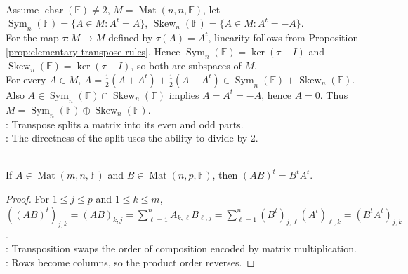 \begin{example} \label{ex:matrix-space-symmetric-skew-direct-sum} \\
Assume $\operatorname{char}(\mathbb{F})\neq2$, $M=\operatorname{Mat}(n,n,\mathbb{F})$, let $\operatorname{Sym}_n(\mathbb{F})=\{A\in M:A^t=A\}$, $\operatorname{Skew}_n(\mathbb{F})=\{A\in M:A^t=-A\}$.\\
For the map $\tau:M\to M$ defined by $\tau(A)=A^t$, linearity follows from Proposition \ref{prop:elementary-transpose-rules}. Hence $\operatorname{Sym}_n(\mathbb{F})=\ker(\tau-I)$ and $\operatorname{Skew}_n(\mathbb{F})=\ker(\tau+I)$, so both are subspaces of $M$.\\
For every $A\in M$, $A=\frac12(A+A^t)+\frac12(A-A^t) \in\operatorname{Sym}_n(\mathbb{F})+\operatorname{Skew}_n(\mathbb{F})$.\\
Also $A\in\operatorname{Sym}_n(\mathbb{F})\cap\operatorname{Skew}_n(\mathbb{F})$ implies $A=A^t=-A$, hence $A=0$. Thus $M=\operatorname{Sym}_n(\mathbb{F})\oplus\operatorname{Skew}_n(\mathbb{F})$.\\
: Transpose splits a matrix into its even and odd parts.\\
: The directness of the split uses the ability to divide by $2$.
\end{example}

\begin{proposition} \label{prop:transpose-reverses-products} \\
If $A\in\operatorname{Mat}(m,n,\mathbb{F})$ and $B\in\operatorname{Mat}(n,p,\mathbb{F})$, then $(AB)^t=B^tA^t$.
\begin{proof}
For $1\leq j\leq p$ and $1\leq k\leq m$, $((AB)^t)_{j,k}=(AB)_{k,j}=\sum\limits_{\ell=1}^n A_{k,\ell}B_{\ell,j}=\sum\limits_{\ell=1}^n (B^t)_{j,\ell}(A^t)_{\ell,k}=(B^tA^t)_{j,k}$.\\
: Transposition swaps the order of composition encoded by matrix multiplication.\\
: Rows become columns, so the product order reverses.
\end{proof}
\end{proposition}

